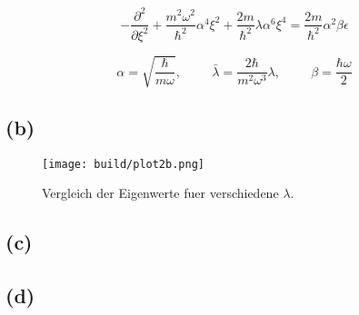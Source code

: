 \documentclass{scrartcl}
\begin{document}
\begin{equation}
		- \frac{\partial^2}{\partial \xi^2} + \frac{m^2
		\omega^2}{\hbar^2} \alpha^4 \xi^2 + \frac{2m}{\hbar^2} \lambda \alpha^6
		\xi^4 = \frac{2m}{\hbar^2} \alpha^2 \beta \epsilon
\end{equation}

\begin{equation}
		\alpha = \sqrt{\frac{\hbar}{m \omega}}, \hspace{1cm} \bar{\lambda} =
		\frac{2 \hbar}{m^2 \omega^3} \lambda, \hspace{1cm} \beta = \frac{\hbar
		\omega}{2}
\end{equation}
\subsection*{(b)}
\begin{figure}[ht]
  \centering
  \texttt{[image: build/plot2b.png]}
  \caption{Vergleich der Eigenwerte fuer verschiedene $\lambda$.}%
  \label{fig:2b}
\end{figure}

\subsection*{(c)}

\subsection*{(d)}
\end{document}
